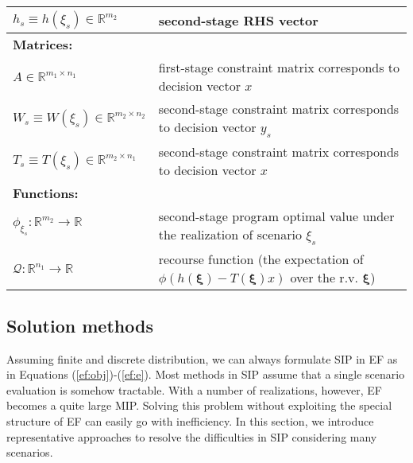\begin{table}[]
{\begin{tabular}{ll}
			$h_s\equiv h(\xi_s)\in\mathbb{R}^{m_2}$	& second-stage RHS vector\\ \midrule
			\multicolumn{2}{l}{\textbf{Matrices:}} \\  
			$A\in\mathbb{R}^{m_1\times n_1}$	& first-stage constraint matrix corresponds to decision vector $x$\\
			$W_s\equiv W(\xi_s)\in\mathbb{R}^{m_2\times n_2}$	& second-stage constraint matrix corresponds to decision vector $y_s$\\
			$T_s\equiv T(\xi_s)\in\mathbb{R}^{m_2\times n_1}$	& second-stage constraint matrix corresponds to decision vector $x$\\ \midrule
			\multicolumn{2}{l}{\textbf{Functions:}} \\
			$\phi_{\xi_s}:\mathbb{R}^{m_2}\to\mathbb{R}$	& second-stage program optimal value under the realization of scenario $\xi_s$	\\
			$\mathcal{Q}:\mathbb{R}^{n_1}\to\mathbb{R}$	& recourse function (the expectation of $\phi\left( h(\pmb{\xi})-T(\pmb{\xi})x \right)$ over the r.v. $\pmb{\xi}$) 	\\
			\bottomrule
		\end{tabular}
	}
\end{table} 

\subsection{Solution methods}
Assuming finite and discrete distribution, we can always formulate SIP in EF as in Equations (\ref{ef:obj})-(\ref{ef:e}).  %
Most methods in SIP assume that a single scenario evaluation is somehow tractable. With a number of realizations, however, EF becomes a quite large MIP. Solving this problem without exploiting the special structure of EF can easily go with inefficiency. In this section, we introduce representative approaches to resolve the difficulties in SIP considering many scenarios.

